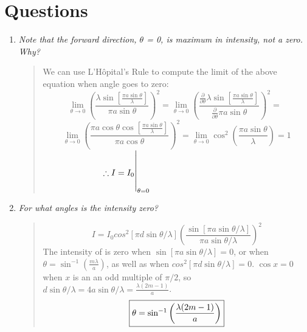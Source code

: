 \documentclass[double]{amsart}
\begin{document}
{\section{Questions}

\begin{enumerate}
%
\item{\textit{Note that the forward direction, $\theta$ = 0, is maximum in intensity, not a zero. Why?}
\begin{quote}
We can use L'H\^{o}pital's Rule to compute the limit of the above equation when angle goes to zero:
$$\lim_{\theta\to0} \left( \dfrac{\lambda\sin\left[\frac{\pi a \sin\theta}{\lambda}\right]}{\pi a \sin\theta}\right)^2 = \lim_{\theta\to0}  \left( \dfrac{\frac{\partial}{\partial \theta}\lambda\sin\left[\frac{\pi a \sin\theta}{\lambda}\right]}{\frac{\partial}{\partial \theta} \pi a \sin\theta}\right)^2 = \ \ $$$$\lim_{\theta\to0} \left(\dfrac{\pi a \cos\theta \cos[\frac{\pi a \sin\theta}{\lambda}]}{\pi a \cos\theta}\right)^2 =\lim_{\theta\to0} \cos^2\left(\dfrac{\pi a \sin\theta}{\lambda}\right) = 1$$ 
\ \ \ \ \ \ \ \ \ \ \ \ \ \   $ \huge\therefore I = I_0\biggr\rvert_{\theta = 0}$ 
\end{quote}}
\medskip
\item {\textit{For what angles is the intensity zero?}
\begin{quote}
$$I = I_0 cos^2\left[\pi d  \sin \theta / \lambda \right]\left(\dfrac{\sin [\pi a  \sin\theta/\lambda]}{\pi a \sin\theta / \lambda}\right)^{2}$$
The intensity of is zero when $\sin [ \pi a \sin \theta / \lambda] = 0 $, or when $\theta = \sin^{-1}\left(\frac{m \lambda}{a}\right)$, as well as when $cos^2\left[\pi d  \sin \theta / \lambda \right] = 0$. $\cos x = 0$ when $x$ is an an odd multiple of $\pi /2 $, so $d \sin \theta/\lambda = 4a \sin\theta/\lambda = \frac{\lambda(2m -1)}{a}$. 
\[ \boxed{
$$\theta = \sin^{-1}\left(\dfrac{\lambda(2m-1)}{a} \right)$$
}\]
\end{quote}}
\end{enumerate}

\paragraph{}





}
\end{document}
